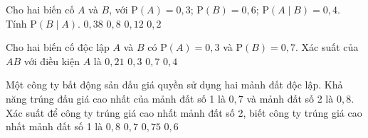 \begin{ex}%
	Cho hai biến cố $A$  và $B$, với $\mathrm{P}(A)=0{,}3$; $\mathrm{P}(B)=0{,}6$; $\mathrm{P}\left(A\mid B\right)=0{,}4$. Tính $\mathrm{P}\left(B\mid A\right)$.
	\choice 
		 {$0{,}38$}
		{\True  $0{,}8$}
		 {$0{,}12$}
		{$0{,}2$} 
\end{ex}

\begin{ex}%
	Cho hai biến cố độc lập $A$ và $B$  có $\mathrm{P}(A)=0{,}3$ và $\mathrm{P}(B)=0{,}7$. Xác suất của $AB$ với điều kiện $A$ là
	\choice 
		{$0{,}21$} 
		{$0{,}3$} 
		{\True  $0{,}7$}
		{$0{,}4$} 
\end{ex}

\begin{ex}%
	Một công ty bất động sản đấu giá quyền sử dụng hai mảnh đất độc lập. Khả năng trúng đấu giá cao nhất của mảnh đất số 1 là $0{,}7$ và mảnh đất số 2 là $0{,}8$. Xác suất để công ty trúng giá cao nhất mảnh đất số 2, biết công ty trúng giá cao nhất  mảnh đất số 1 là
	 \choice
		 {\True $0{,}8$}
		 {$0{,}7$}
		{$0{,}75$} 
		{$0{,}6$} 
\end{ex}

